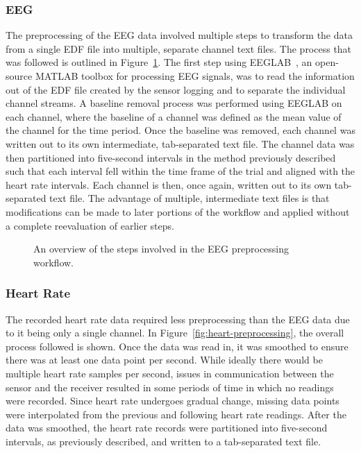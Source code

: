 \documentclass[11pt]{article}
\begin{document}
		\subsubsection{EEG}
		The preprocessing of the EEG data involved multiple steps to transform the data from a single EDF file into multiple, separate channel text files. The process that was followed is outlined in Figure~\ref{fig:eeg-preprocessing}. The first step using EEGLAB~\cite{EEGLAB}, an open-source MATLAB toolbox for processing EEG signals, was to read the information out of the EDF file created by the sensor logging and to separate the individual channel streams. A baseline removal process was performed using EEGLAB on each channel, where the baseline of a channel was defined as the mean value of the channel for the time period. Once the baseline was removed, each channel was written out to its own intermediate, tab-separated text file. The channel data was then partitioned into five-second intervals in the method previously described such that each interval fell within the time frame of the trial and aligned with the heart rate intervals. Each channel is then, once again, written out to its own tab-separated text file. The advantage of multiple, intermediate text files is that modifications can be made to later portions of the workflow and applied without a complete reevaluation of earlier steps.

		\begin{figure}
		\centering
		\caption[Overview of EEG Preprocessing Workflow]{An overview of the steps involved in the EEG preprocessing workflow.}
		\label{fig:eeg-preprocessing}
		\end{figure} 
			
		\subsubsection{Heart Rate}
		The recorded heart rate data required less preprocessing than the EEG data due to it being only a single channel. In Figure~\ref{fig:heart-preprocessing}, the overall process followed is shown. Once the data was read in, it was smoothed to ensure there was at least one data point per second. While ideally there would be multiple heart rate samples per second, issues in communication between the sensor and the receiver resulted in some periods of time in which no readings were recorded.  Since heart rate undergoes gradual change, missing data points were interpolated from the previous and following heart rate readings.  After the data was smoothed, the heart rate records were partitioned into five-second intervals, as previously described, and written to a tab-separated text file.  
\end{document}
